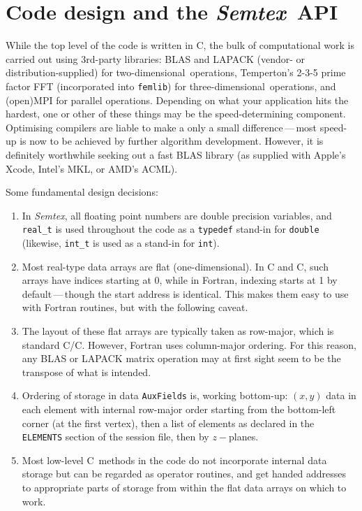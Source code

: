 \documentclass[11pt]{report}
\newcommand{\Semtex}{\emph{Semtex}} \newcommand{\Dog}{\emph{Dog}}
\newcommand\oned{one-di\-men\-sion\-al}
\newcommand\twod{two-di\-men\-sion\-al}
\newcommand\threed{three-di\-men\-sion\-al}
\newcommand\cpp{C\nolinebreak\hspace{-.05em}\raisebox{.3ex}{\footnotesize\bf
+}\nolinebreak\hspace{-.10em}\raisebox{.3ex}{\footnotesize\bf+}}
\begin{document}
\chapter{Code design and the \Semtex\ API}
\label{ch.api}



While the top level of the code is written in \cpp, the bulk of
computational work is carried out using 3rd-party libraries: BLAS and
LAPACK (vendor- or distribution-supplied) for \twod\ operations,
Temperton's 2-3-5 prime factor FFT (incorporated into \texttt{femlib})
for \threed\ operations, and (open)MPI for parallel operations.
Depending on what your application hits the hardest, one or other of
these things may be the speed-determining component. Optimising
compilers are liable to make a only a small difference\,---\,most
speed-up is now to be achieved by further algorithm development.
However, it is definitely worthwhile seeking out a fast BLAS library
(as supplied with Apple's Xcode, Intel's MKL, or AMD's ACML).

Some fundamental design decisions:
\begin{enumerate}
\item
  In \Semtex, all floating point numbers are double precision
  variables, and \verb|real_t| is used throughout the code as a
  \verb|typedef| stand-in for \verb|double| (likewise, \verb|int_t| is
  used as a stand-in for \verb|int|).
\item
  Most real-type data arrays are flat (\oned).  In C and \cpp, such
  arrays have indices starting at 0, while in Fortran, indexing starts
  at 1 by default\,---\,though the start address is identical. This
  makes them easy to use with Fortran routines, but with the following
  caveat.
\item
  The layout of these flat arrays are typically taken as row-major,
  which is standard C/\cpp. However, Fortran uses column-major
  ordering. For this reason, any BLAS or LAPACK matrix operation may
  at first sight seem to be the transpose of what is intended.
\item
  Ordering of storage in data \verb|AuxFields| is, working bottom-up:
  $(x,y)$ data in each element with internal row-major order starting
  from the bottom-left corner (\ie at the first vertex), then a list
  of elements as declared in the \verb|ELEMENTS| section of the
  session file, then by $z-$planes.
\item
  Most low-level \cpp\ methods in the code do not incorporate internal
  data storage but can be regarded as operator routines, and get
  handed addresses to appropriate parts of storage from within the
  flat data arrays on which to work.
\end{enumerate}
\end{document}
